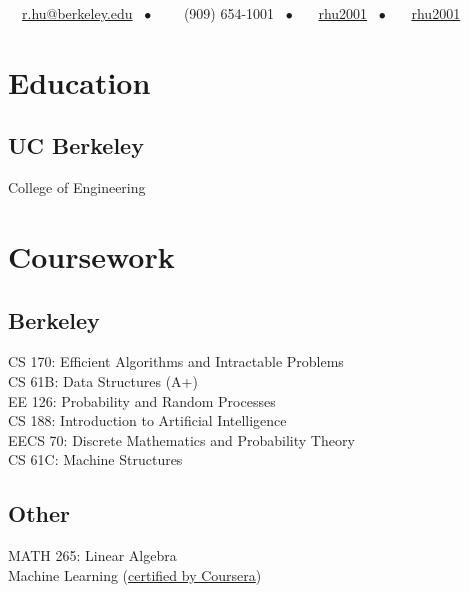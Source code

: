 \documentclass[]{deedy-resume-openfont}
\begin{document}
%
%
{\faEnvelope \ \ \href{mailto:r.hu@berkeley.edu}{r.hu@berkeley.edu} \ \(\bullet\) \ \ \faPhone \ \ (909)  654-1001 \ \(\bullet\) \ \faGithub \ \ \href{https://github.com/rhu2001}{rhu2001} \ \(\bullet\) \ \faLinkedin \ \ \href{https://www.linkedin.com/in/rhu2001/}{rhu2001}}

%
%

\begin{minipage}[t]{0.33\textwidth} 


\section{Education} 

\subsection{UC Berkeley}
College of Engineering \\


\section{Coursework}

\subsection{Berkeley}
CS 170: Efficient Algorithms and Intractable Problems \\
CS 61B: Data Structures (A+) \\
EE 126: Probability and Random Processes \\
CS 188: Introduction to Artificial Intelligence \\
EECS 70: Discrete Mathematics and Probability Theory \\
CS 61C: Machine Structures \\
\subsection{Other}
MATH 265: Linear Algebra \\
Machine Learning (\href{https://coursera.org/share/f28a9bb54a4cca7c445539ba73aa3d48}{certified by Coursera})


\end{minipage}
\end{document}
